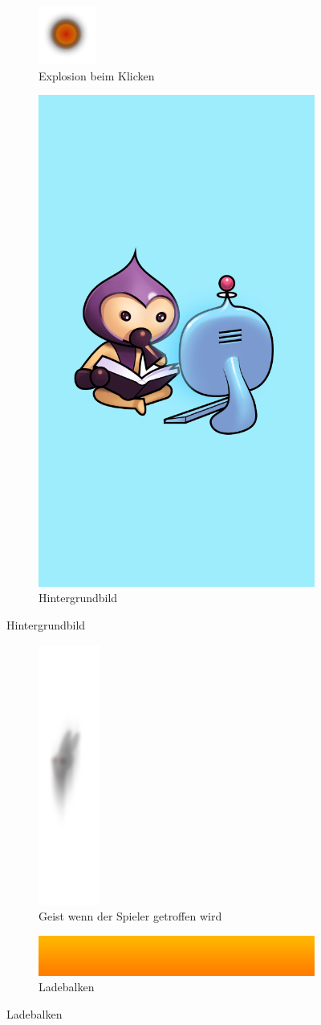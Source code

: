 \documentclass{article}
\begin{document}
\begin{figure}[ht]
\centering
\begin{subfigure}{.5\textwidth}
  \centering
  \includegraphics[width=.3\linewidth]{explosion}
  \caption{Explosion beim Klicken}
  \label{fig:sub1}
\end{subfigure}%
\begin{subfigure}{.5\textwidth}
  \centering
  \includegraphics[width=.3\linewidth]{titleBG}
  \caption{Hintergrundbild}
  \label{fig:sub2}
\end{subfigure}
\end{figure}



\begin{figure}[ht]
\centering
\begin{subfigure}{.5\textwidth}
  \centering
  \includegraphics[width=.1\linewidth]{ghost}
  \caption{Geist wenn der Spieler getroffen wird}
  \label{fig:sub1}
\end{subfigure}%
\begin{subfigure}{.5\textwidth}
  \centering
  \includegraphics[width=.3\linewidth]{loader_bar}
  \caption{Ladebalken}
  \label{fig:sub2}
\end{subfigure}
\end{figure}
\end{document}
